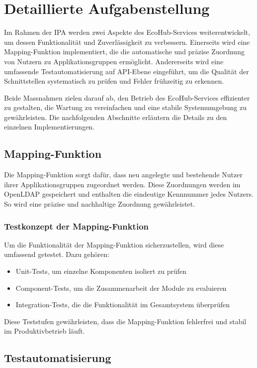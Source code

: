 \section{Detaillierte Aufgabenstellung}
Im Rahmen der IPA werden zwei Aspekte des EcoHub-Services weiterentwickelt, um dessen
Funktionalität und Zuverlässigkeit zu verbessern. Einerseits wird eine Mapping-Funktion
implementiert, die die automatische und präzise Zuordnung von Nutzern zu Applikationsgruppen
ermöglicht. Andererseits wird eine umfassende Testautomatisierung auf API-Ebene eingeführt, um
die Qualität der Schnittstellen systematisch zu prüfen und Fehler frühzeitig zu erkennen.

Beide Massnahmen zielen darauf ab, den Betrieb des EcoHub-Services effizienter zu gestalten, die
Wartung zu vereinfachen und eine stabile Systemumgebung zu gewährleisten. Die nachfolgenden
Abschnitte erläutern die Details zu den einzelnen Implementierungen.

\subsection{Mapping-Funktion}
Die Mapping-Funktion sorgt dafür, dass neu angelegte und bestehende Nutzer ihrer
Applikationsgruppen zugeordnet werden. Diese Zuordnungen werden im OpenLDAP gespeichert
und enthalten die eindeutige Kennnummer jedes Nutzers. So wird eine präzise und nachhaltige Zuordnung gewährleistet.

\subsubsection{Testkonzept der Mapping-Funktion}
Um die Funktionalität der Mapping-Funktion sicherzustellen, wird diese umfassend getestet. Dazu
gehören:
\begin{itemize}
    \item Unit-Tests, um einzelne Komponenten isoliert zu prüfen
    \item Component-Tests, um die Zusammenarbeit der Module zu evaluieren
    \item Integration-Tests, die die Funktionalität im Gesamtsystem überprüfen
\end{itemize}
Diese Teststufen gewährleisten, dass die Mapping-Funktion fehlerfrei und stabil im Produktivbetrieb läuft.

\subsection{Testautomatisierung}
